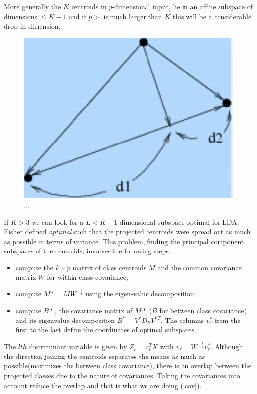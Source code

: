 \documentclass[12pt, letterpaper]{article}
\theoremstyle{definition}
\begin{document}
More generally the $K$ centroids in $p$-dimensional input, lie in an affine subspace of dimensions $\le K-1$ and if $p>$ is much larger than $K$ this will be a considerable drop in dimension.


\begin{figure}
\centering
\includegraphics[scale=0.4]{img/proj}
\caption{...}
\label{proj}
\end{figure}

If $K>3$ we can look for a $L<K-1$ dimensional subspace optimal for LDA. Fisher defined \textit{optimal} such that the projected centroids were spread out as much as possible in terms of variance.
This problem, finding the principal component subspaces of the centroids, involves the following steps:
\begin{itemize}
\item compute the $k\times p$ matrix of class centroids $M$ and the common covariance matrix $W$ for within-class covariance;
\item compute $M*=MW^{-\frac{1}{2}}$ using the eigen-value decomposition;
\item compute $B*$, the covariance matrix of $M*$ ($B$ for between class covariance) and its eigenvalue decomposition $B^{*}=V^{*}D_BV^{*T}$. The columns $v^*_\ell$ from the first to the last define the coordinates of optimal subspaces.
\end{itemize}
The $lth$ discriminant variable is given by $Z_\ell =  v_\ell^TX$ with $v_\ell=W^{-\frac{1}{2}} v^*_\ell$.  Although the direction joining the centroids separates the means as much as possible(maximizes the between class covariance), there is an overlap between the projected classes due to the nature of covariances. Taking the covariances into account reduce the overlap and that is what we are doing (\autoref{cov}).
\end{document}
